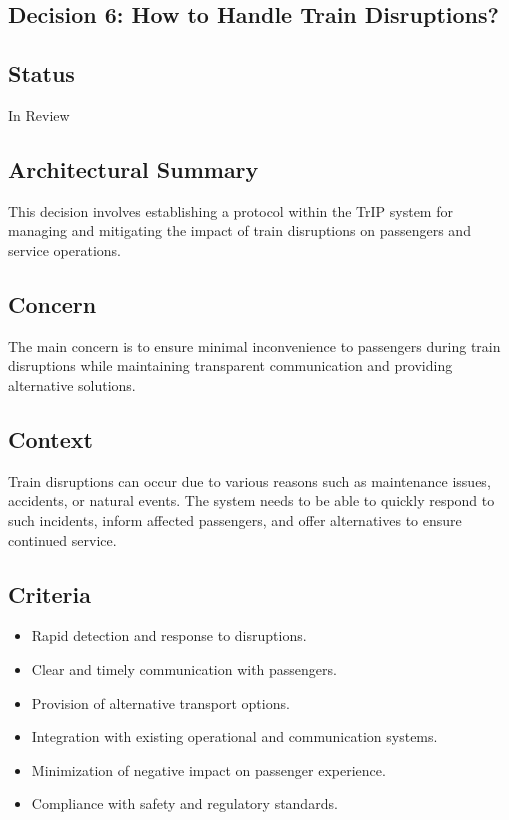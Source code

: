 \subsection{Decision 6: How to Handle Train Disruptions?}

\subsection*{Status}
In Review

\subsection*{Architectural Summary}
This decision involves establishing a protocol within the TrIP system for managing and mitigating the impact of train disruptions on passengers and service operations.

\subsection*{Concern}
The main concern is to ensure minimal inconvenience to passengers during train disruptions while maintaining transparent communication and providing alternative solutions.

\subsection*{Context}
Train disruptions can occur due to various reasons such as maintenance issues, accidents, or natural events. The system needs to be able to quickly respond to such incidents, inform affected passengers, and offer alternatives to ensure continued service.

\subsection*{Criteria}
\begin{itemize}
    \item Rapid detection and response to disruptions.
    \item Clear and timely communication with passengers.
    \item Provision of alternative transport options.
    \item Integration with existing operational and communication systems.
    \item Minimization of negative impact on passenger experience.
    \item Compliance with safety and regulatory standards.
\end{itemize}

